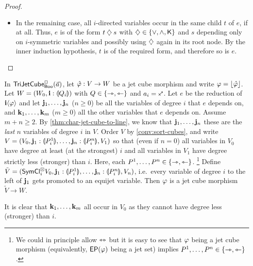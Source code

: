 \documentclass[a4paper]{memoir}
\begin{document}
\begin{proof}
\begin{itemize}
		\item In the remaining case, all $i$-directed variables occur in the same child $t$ of $e$, if at all.
		Thus, $e$ is of the form $t \mathbin{\diamondsuit} s$ with $\mathbin{\diamondsuit} \in \mathopen{}\left\{ {\vee}, {\wedge}, {\mathbin{\mathsf{K}}} \right\}\mathclose{}$ and $s$ depending only on $i$-symmetric variables and possibly using $\mathbin{\diamondsuit}$ again in its root node.
		By the inner induction hypothesis, $t$ is of the required form, and therefore so is $e$. \qedhere
	\end{itemize}
\end{proof}
\begin{lemma} \label{thm:left-of-connection}
	In $\mathsf{TriJetCube}^{\Box}_{\mathsf{Boo}}\mathopen{}\left( \vec a \right)\mathclose{}$, let $\hat {\varphi} : V \to W$ be a jet cube morphism and write $\varphi = \mathopen{}\left\lfloor \hat {\varphi} \right\rfloor\mathclose{}$.
	Let $W = (W_0, \mathbf{i} : {\llparenthesis Q_i \rrparenthesis})$ with $Q \in \mathopen{}\left\{ \rightarrowtriangle, \leftarrowtriangle \right\}\mathclose{}$ and $a_i = \ypolar$.
	Let $e$ be the reduction of $\mathbf{i} \langle \varphi \rangle$ and let $\mathbf{j}_1, \ldots, \mathbf{j}_n$ ($n \geq 0$) be all the variables of degree $i$ that $e$ depends on, and $\mathbf{k}_1, \ldots, \mathbf{k}_m$ ($m \geq 0$) all the other variables that $e$ depends on.
	Assume $m+n \geq 2$.
	By \cref{thm:char-jet-cube-to-line}, we know that $\mathbf{j}_1, \ldots, \mathbf{j}_n$ these are the \emph{last} $n$ variables of degree $i$ in $V$.
	Order $V$ by \cref{conv:sort-cubes}, and write $V = (V_0, \mathbf{j}_1 : {\llparenthesis P^1_i \rrparenthesis}, \ldots, \mathbf{j}_n : {\llparenthesis P^n_i \rrparenthesis}, V_1)$ so that (even if $n = 0$) all variables in $V_0$ have degree at least (at the strongest) $i$ and all variables in $V_1$ have degree strictly less (stronger) than $i$.
	Here, each $P^1, \ldots, P^n \in \mathopen{}\left\{ \rightarrowtriangle, \leftarrowtriangle \right\}\mathclose{}$.%
	\footnote{We could in principle allow $\leftrightarrowtriangle$ but it is easy to see that $\varphi$ being a jet cube morphism (equivalently, $\mathsf{EP}(\varphi)$ being a jet set) implies $P^1, \ldots, P^n \in \mathopen{}\left\{ \rightarrowtriangle, \leftarrowtriangle \right\}\mathclose{}$.}
	Define $\tilde V = (\mathsf{SymCl}^\boxdot_i V_0, \mathbf{j}_1 : {\llparenthesis P^1_i \rrparenthesis}, \ldots, \mathbf{j}_n : {\llparenthesis P^n_i \rrparenthesis}, V_n)$, i.e.\ every variable of degree $i$ to the left of $\mathbf{j}_1$ gets promoted to an equijet variable.
	Then $\varphi$ is a jet cube morphism $\tilde V \to W$.
\end{lemma}
It is clear that $\mathbf{k}_1, \ldots, \mathbf{k}_m$ all occur in $V_0$ as they cannot have degree less (stronger) than $i$.
\end{document}
